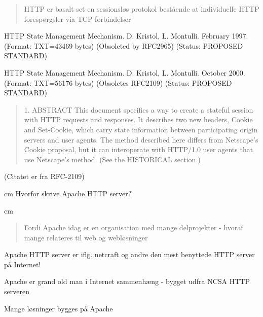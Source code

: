 \begin{quote}
HTTP er basalt set en sessionsløs protokol bestående at individuelle
HTTP forespørgsler via TCP forbindelser  
\end{quote}

\begin{list2}
\item[2109] HTTP State Management Mechanism. D. Kristol, L. Montulli.
     February 1997. (Format: TXT=43469 bytes) (Obsoleted by RFC2965)
     (Status: PROPOSED STANDARD)
\item[2965] HTTP State Management Mechanism. D. Kristol, L. Montulli. October
     2000. (Format: TXT=56176 bytes) (Obsoletes RFC2109) (Status: PROPOSED
     STANDARD)
\end{list2}
\begin{quote}
1.  ABSTRACT
   This document specifies a way to create a stateful session with HTTP
   requests and responses.  It describes two new headers, Cookie and
   Set-Cookie, which carry state information between participating
   origin servers and user agents.  The method described here differs
   from Netscape's Cookie proposal, but it can interoperate with
   HTTP/1.0 user agents that use Netscape's method.  (See the HISTORICAL
   section.)
\end{quote}

(Citatet er fra RFC-2109)


 cm
{\hlkbig Hvorfor skrive Apache HTTP server?}

 cm
\begin{quote}
Fordi Apache idag er en organisation med mange delprojekter - hvoraf
mange relateres til web og webløsninger  
\end{quote}



\begin{list1}
\item Apache HTTP server er iflg. netcraft og andre den mest benyttede
  HTTP server på Internet!
\item Apache er grand old man i Internet sammenhæng - bygget udfra
  NCSA HTTP serveren
\item Mange løsninger bygges på Apache
\end{list1}

